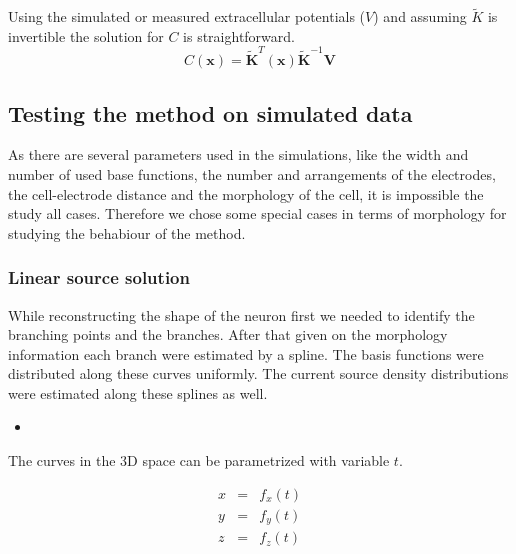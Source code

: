 \documentclass[12pt,a4paper]{article}
\begin{document}
Using the simulated or measured extracellular potentials ($V$) and assuming $\tilde{K}$ is invertible the solution for $C$ is straightforward.
 \begin{equation}
 C(\textbf{x})=\tilde{\textbf{K}}^T(\textbf{x})  
 \tilde{\textbf{K}}^{-1} \textbf{V}
 \end{equation}




\subsection{Testing the method on simulated data}
As there are several parameters used in the simulations, like the width and number of used base functions, the number and arrangements of the electrodes, the cell-electrode distance and the morphology of the cell, it is impossible the study all cases. Therefore we chose some special cases in terms of morphology for studying the behabiour of the method. 

\subsubsection{ Linear source solution }
While reconstructing the shape of the neuron first we needed to identify the branching points and the branches. After that given on the morphology information each branch were estimated by a spline. The basis functions were distributed along these curves uniformly. The current source density distributions were estimated along these splines as well. 



\begin{itemize}
\item 
\end{itemize}
The curves in the 3D space can be parametrized with variable $t$. 


\begin{eqnarray}
\displaystyle x &=& f_x(t)  \nonumber \\
\displaystyle y &=& f_y(t)  \\
\displaystyle z &=& f_z(t)  \nonumber 
\end{eqnarray}
\end{document}
